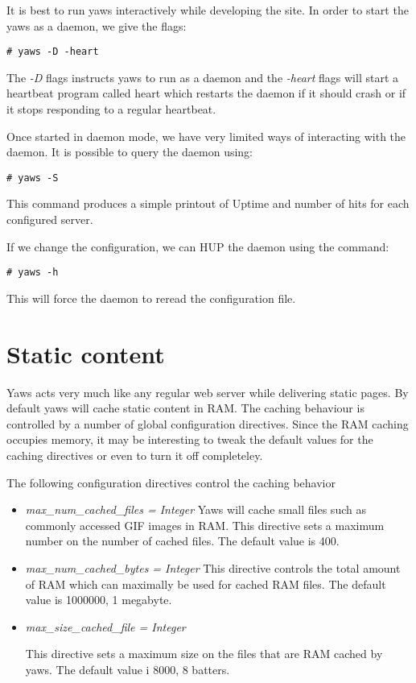\documentclass[11pt,oneside,english]{book}
\begin{document}
It is best to run yaws interactively while developing the site.
In order to start the yaws as a daemon, we give the flags:
\begin{verbatim}
# yaws -D -heart
\end{verbatim}

The \textit{-D} flags instructs yaws to run as a daemon and the 
\textit{-heart} flags will start a heartbeat program called heart
which restarts the daemon if it should crash or if it stops responding to
a regular heartbeat.

Once started in daemon mode, we have very limited ways of interacting
with the daemon. It is possible to query the daemon using:
\begin{verbatim}
# yaws -S
\end{verbatim}

This command produces a simple printout of Uptime and number of hits
for each configured server.

If we change the configuration, we can HUP the daemon using the
command:
\begin{verbatim}
# yaws -h
\end{verbatim}

This will force the daemon to reread the configuration file.



\chapter{Static content}

Yaws acts very much like any regular web server while delivering
static pages. By default yaws will cache static content in RAM.
The caching behaviour is controlled by a number of global
configuration directives. Since the RAM caching occupies memory, 
it may be interesting to tweak the default values for the caching directives
or even to turn it off completeley.

The following configuration directives control the caching behavior
\begin{itemize}
\item \textit{max\_num\_cached\_files = Integer}
Yaws  will  cache  small  files  such  as  commonly
              accessed  GIF images in RAM.  This directive sets a
              maximum number on the number of cached files.   The
              default value is 400.

\item\textit{max\_num\_cached\_bytes = Integer}
 This  directive  controls  the  total amount of RAM
             which can maximally be used for cached  RAM  files.
              The default value is 1000000, 1 megabyte.


\item\textit{max\_size\_cached\_file = Integer}

 This  directive  sets  a  maximum size on the files
              that are RAM cached by yaws.  The default  value  i
              8000, 8 batters.



\end{itemize}
\end{document}
